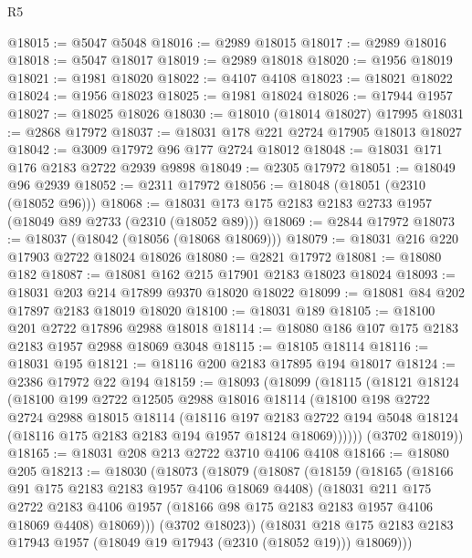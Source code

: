 \begin{lexlean}{R5}
\begin{coremodule}
@18015 := @5047 @5048
@18016 := @2989 @18015
@18017 := @2989 @18016
@18018 := @5047 @18017
@18019 := @2989 @18018
@18020 := @1956 @18019
@18021 := @1981 @18020
@18022 := @4107 @4108
@18023 := @18021 @18022
@18024 := @1956 @18023
@18025 := @1981 @18024
@18026 := @17944 @1957
@18027 := @18025 @18026
@18030 := @18010 (@18014 @18027) @17995
@18031 := @2868 @17972
@18037 := @18031 @178 @221 @2724 @17905 @18013 @18027
@18042 := @3009 @17972 @96 @177 @2724 @18012
@18048 := @18031 @171 @176 @2183 @2722 @2939 @9898
@18049 := @2305 @17972
@18051 := @18049 @96 @2939
@18052 := @2311 @17972
@18056 := @18048 (@18051 (@2310 (@18052 @96)))
@18068 := @18031 @173 @175 @2183 @2183 @2733 @1957 (@18049 @89 @2733 (@2310 (@18052 @89)))
@18069 := @2844 @17972
@18073 := @18037 (@18042 (@18056 (@18068 @18069)))
@18079 := @18031 @216 @220 @17903 @2722 @18024 @18026
@18080 := @2821 @17972
@18081 := @18080 @182
@18087 := @18081 @162 @215 @17901 @2183 @18023 @18024
@18093 := @18031 @203 @214 @17899 @9370 @18020 @18022
@18099 := @18081 @84 @202 @17897 @2183 @18019 @18020
@18100 := @18031 @189
@18105 := @18100 @201 @2722 @17896 @2988 @18018
@18114 := @18080 @186 @107 @175 @2183 @2183 @1957 @2988 @18069 @3048
@18115 := @18105 @18114
@18116 := @18031 @195
@18121 := @18116 @200 @2183 @17895 @194 @18017
@18124 := @2386 @17972 @22 @194
@18159 := @18093
    (@18099
      (@18115
        (@18121
          @18124
          (@18100
            @199
            @2722
            @12505
            @2988
            @18016
            @18114
            (@18100
              @198
              @2722
              @2724
              @2988
              @18015
              @18114
              (@18116
                @197
                @2183
                @2722
                @194
                @5048
                @18124
                (@18116 @175 @2183 @2183 @194 @1957 @18124 @18069))))))
      (@3702 @18019))
@18165 := @18031 @208 @213 @2722 @3710 @4106 @4108
@18166 := @18080 @205
@18213 := @18030
    (@18073
      (@18079
        (@18087
          (@18159
            (@18165
              (@18166 @91 @175 @2183 @2183 @1957 @4106 @18069 @4408)
              (@18031
                @211
                @175
                @2722
                @2183
                @4106
                @1957
                (@18166 @98 @175 @2183 @2183 @1957 @4106 @18069 @4408)
                @18069)))
          (@3702 @18023))
        (@18031
          @218
          @175
          @2183
          @2183
          @17943
          @1957
          (@18049 @19 @17943 (@2310 (@18052 @19)))
          @18069)))

\end{coremodule}
\end{lexlean}
